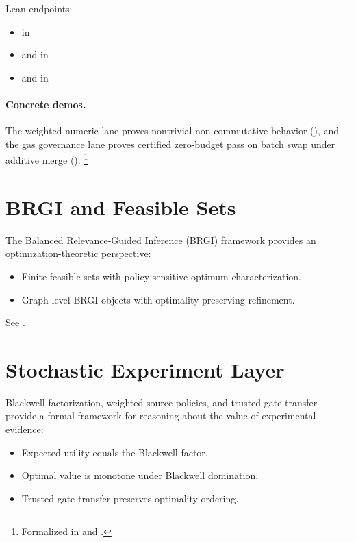 \documentclass[11pt,openany]{report}
\begin{document}
Lean endpoints:
\begin{itemize}
\item {} in
\item {} and
   in
\item {} and
   in
\end{itemize}

\paragraph{Concrete demos.}
The weighted numeric lane proves nontrivial non-commutative behavior
(),
and the gas governance lane proves certified zero-budget pass on batch
swap under additive merge
().%
\footnote{Formalized in 
  and .}

\section{BRGI and Feasible Sets}

The Balanced Relevance-Guided Inference (BRGI) framework provides an
optimization-theoretic perspective:
\begin{itemize}
\item Finite feasible sets with policy-sensitive optimum characterization.
\item Graph-level BRGI objects with optimality-preserving refinement.
\end{itemize}

See .

\section{Stochastic Experiment Layer}

Blackwell factorization, weighted source policies, and trusted-gate
transfer provide a formal framework for reasoning about the value of
experimental evidence:
\begin{itemize}
\item Expected utility equals the Blackwell factor.
\item Optimal value is monotone under Blackwell domination.
\item Trusted-gate transfer preserves optimality ordering.
\end{itemize}
\end{document}
